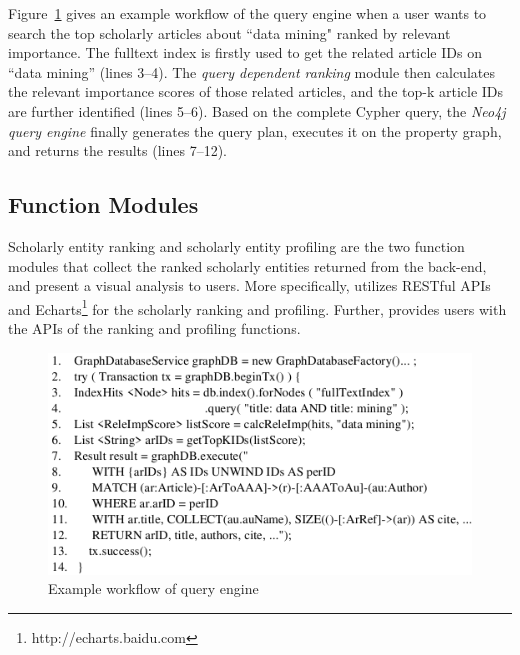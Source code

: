 
Figure~\ref{fig:queryProcess} gives an example workflow of the query engine when a user wants to search the top scholarly articles about ``data mining"  ranked by relevant importance. The fulltext index is firstly used to get the related article IDs on ``data mining'' (lines 3--4). The {\em query dependent ranking} module then calculates the relevant importance scores of those related articles, and the top-k article IDs are further identified (lines 5--6). Based on the complete Cypher query, the {\em Neo4j query engine} finally generates the query plan, executes it on the property graph, and returns the results (lines 7--12).

\subsection{Function Modules}
Scholarly entity ranking and scholarly entity profiling are the two function modules that collect the ranked scholarly entities returned from the back-end, and present a visual analysis to users. More specifically, \oursystem utilizes RESTful APIs  and Echarts\footnote{ http://echarts.baidu.com} for the scholarly ranking and profiling. Further, \oursystem provides users with the APIs of the ranking and profiling functions.

\begin{figure}
\centering
\includegraphics[width=\columnwidth]{queryProcess.pdf}
\vspace{-3ex}
\caption{Example workflow of \oursystem query engine}
\label{fig:queryProcess}
\vspace{-2ex}
\end{figure}



